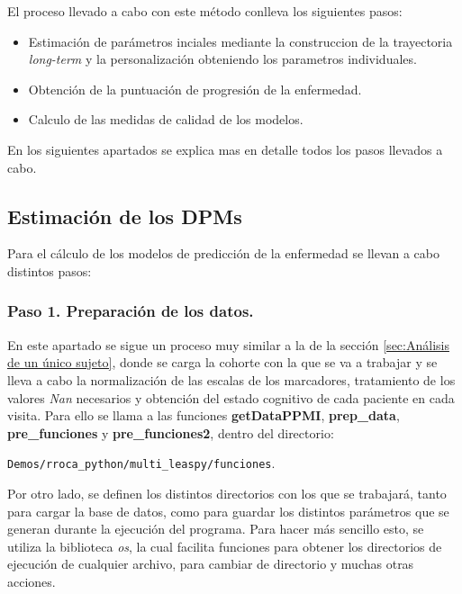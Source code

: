 El proceso llevado a cabo con este método conlleva los siguientes pasos:\\
\begin{itemize}
	\item Estimación de parámetros inciales mediante la construccion de la trayectoria \textit{long-term} y la personalización obteniendo los parametros individuales.
	\item Obtención de la puntuación de progresión de la enfermedad.
	\item Calculo de las medidas de calidad de los modelos.
\end{itemize}

En los siguientes apartados se explica mas en detalle todos los pasos llevados a cabo.






\subsection{Estimación de los DPMs}
Para el cálculo de los modelos de predicción de la enfermedad se llevan a cabo distintos pasos:\\


\subsubsection{Paso 1. Preparación de los datos.}
	
En este apartado se sigue un proceso muy similar a la  de la sección \ref{sec:Análisis de un único sujeto}, donde se carga la cohorte con la que se va a trabajar y se lleva a cabo la normalización de las escalas de los marcadores, tratamiento de los valores \textit{Nan} necesarios y obtención del estado cognitivo de cada paciente en cada visita. Para ello se llama a las funciones  \textbf{getDataPPMI}, \textbf{prep\_data}, \textbf{pre\_funciones} y \textbf{pre\_funciones2}, dentro del directorio:
\begin{center}
	\texttt{Demos/rroca\_python/multi\_leaspy/funciones}. 
\end{center}
	
Por otro lado, se definen los distintos directorios con los que se trabajará, tanto para cargar la base de datos, como para guardar los distintos parámetros que se generan durante la ejecución del programa. Para hacer más sencillo esto, se utiliza la biblioteca \textit{os}, la cual facilita funciones para obtener los directorios de ejecución de cualquier archivo, para cambiar de directorio y muchas otras acciones. \\
	
